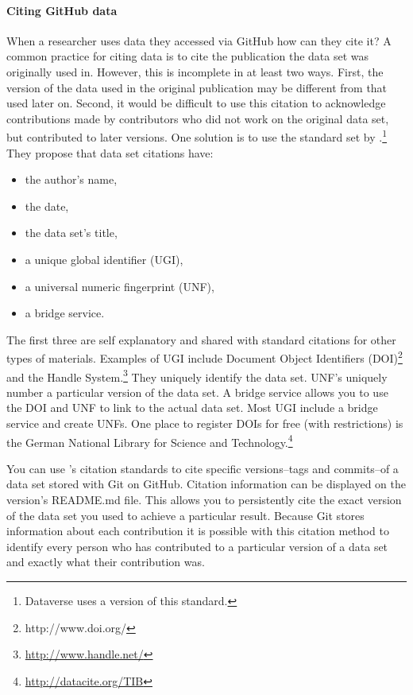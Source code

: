 \documentclass[twocolumn]{article}\usepackage{graphicx, color}
\begin{document}
\paragraph{Citing GitHub data}

When a researcher uses data they accessed via GitHub how can they cite it? A common practice for citing data is to cite the publication the data set was originally used in. However, this is incomplete in at least two ways. First, the version of the data used in the original publication may be different from that used later on. Second, it would be difficult to use this citation to acknowledge contributions made by contributors who did not work on the original data set, but contributed to later versions. One solution is to use the standard set by \cite{Altman2007} \citep[see also][183-184]{King2007}.\footnote{Dataverse uses a version of this standard.} They propose that data set citations have:

\begin{itemize}
  \item the author's name, 
  \item the date,
  \item the data set's title,
  \item a unique global identifier (UGI),
  \item a universal numeric fingerprint (UNF),
  \item a bridge service.
\end{itemize}

\noindent The first three are self explanatory and shared with standard citations for other types of materials. Examples of UGI include Document Object Identifiers (DOI)\footnote{http://www.doi.org/} and the Handle System.\footnote{\url{http://www.handle.net/}} They uniquely identify the data set. UNF's uniquely number a particular version of the data set. A bridge service allows you to use the DOI and UNF to link to the actual data set. Most UGI include a bridge service and create UNFs. One place to register DOIs for free (with restrictions) is the German National Library for Science and Technology.\footnote{\url{http://datacite.org/TIB}} 

You can use \citeauthor{Altman2007}'s citation standards to cite specific versions--tags and commits--of a data set stored with Git on GitHub. Citation information can be displayed on the version's README.md file. This allows you to persistently cite the exact version of the data set you used to achieve a particular result. Because Git stores information about each contribution it is possible with this citation method to identify every person who has contributed to a particular version of a data set and exactly what their contribution was.
\end{document}
